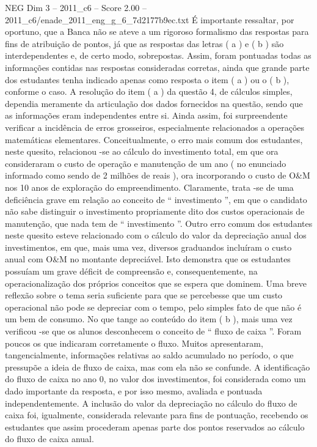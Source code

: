 \begin{textsample}{NEG Dim 3 – 2011\_c6 – Score 2.00 – 2011\_c6/enade\_2011\_eng\_g\_6\_7d2177b9ec.txt}
É importante ressaltar, por oportuno, que a Banca não se ateve a um rigoroso formalismo das respostas para fins de atribuição de pontos, já que as respostas das letras ( a ) e ( b ) são interdependentes e, de certo modo, sobrepostas.
Assim, foram pontuadas todas as informações contidas nas respostas consideradas corretas, ainda que grande parte dos estudantes tenha indicado apenas como resposta o item ( a ) ou o ( b ), conforme o caso.
A resolução do item ( a ) da questão 4, de cálculos simples, dependia meramente da articulação dos dados fornecidos na questão, sendo que as informações eram independentes entre si.
Ainda assim, foi surpreendente verificar a incidência de erros grosseiros, especialmente relacionados a operações matemáticas elementares.
Conceitualmente, o erro mais comum dos estudantes, neste quesito, relacionou -se ao cálculo do investimento total, em que ora consideraram o custo de operação e manutenção de um ano ( no enunciado informado como sendo de 2 milhões de reais ), ora incorporando o custo de O\&M nos 10 anos de exploração do empreendimento.
Claramente, trata -se de uma deficiência grave em relação ao conceito de “ investimento ”, em que o candidato não sabe distinguir o investimento propriamente dito dos custos operacionais de manutenção, que nada tem de “ investimento ”.
Outro erro comum dos estudantes neste quesito esteve relacionado com o cálculo do valor da depreciação anual dos investimentos, em que, mais uma vez, diversos graduandos incluíram o custo anual com O\&M no montante depreciável.
Isto demonstra que os estudantes possuíam um grave déficit de compreensão e, consequentemente, na operacionalização dos próprios conceitos que se espera que dominem.
Uma breve reflexão sobre o tema seria suficiente para que se percebesse que um custo operacional não pode se depreciar com o tempo, pelo simples fato de que não é um bem de consumo.
No que tange ao conteúdo do item ( b ), mais uma vez verificou -se que os alunos desconhecem o conceito de “ fluxo de caixa ”.
Foram poucos os que indicaram corretamente o fluxo.
Muitos apresentaram, tangencialmente, informações relativas ao saldo acumulado no período, o que pressupõe a ideia de fluxo de caixa, mas com ela não se confunde.
A identificação do fluxo de caixa no ano 0, no valor dos investimentos, foi considerada como um dado importante da resposta, e por isso mesmo, avaliada e pontuada independentemente.
A inclusão do valor da depreciação no cálculo do fluxo de caixa foi, igualmente, considerada relevante para fins de pontuação, recebendo os estudantes que assim procederam apenas parte dos pontos reservados ao cálculo do fluxo de caixa anual.

\end{textsample}
